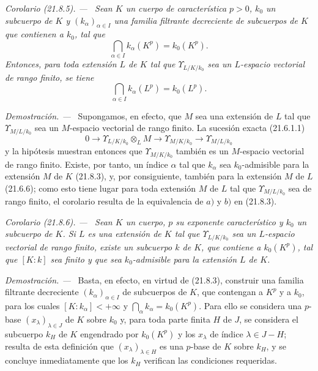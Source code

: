 \documentclass[10pt,oneside]{book}
\makeatletter
\newcommand{\setmanualcurrentlabel}[1]{\def\@currentlabel{#1}}
\newenvironment{corollary}[1][]{%
  \setmanualcurrentlabel{#1}\par\medskip\noindent\itshape Corolario (#1). ---\ }{\par}
\newenvironment{proof}{%
  \par\medskip\noindent\textit{Demostración. ---\ }}{\par}
\providecommand{\setmin}{-}%
\makeatother
\begin{document}
\begin{corollary}[21.8.5]
\label{0.21.8.5-es}
Sean $K$ un cuerpo de característica $p>0$, $k_0$ un subcuerpo de $K$ y
$(k_\alpha)_{\alpha\in I}$ una familia filtrante decreciente de subcuerpos de
$K$ que contienen a $k_0$, tal que
\[
  \bigcap_{\alpha\in I}k_\alpha(K^p)=k_0(K^p).
\]
Entonces, para toda extensión $L$ de $K$ tal que $\Upsilon_{L/K/k_0}$ sea un
$L$-espacio vectorial de rango finito, se tiene
\[
  \bigcap_{\alpha\in I}k_\alpha(L^p)=k_0(L^p).
\]
\end{corollary}

\begin{proof}
Supongamos, en efecto, que $M$ sea una extensión de $L$ tal que
$\Upsilon_{M/L/k_0}$ sea un $M$-espacio vectorial de rango finito. La sucesión
exacta (21.6.1.1)
\[
  0\longrightarrow \Upsilon_{L/K/k_0}\otimes_L M
  \longrightarrow \Upsilon_{M/K/k_0}
  \longrightarrow \Upsilon_{M/L/k_0}
\]
y la hipótesis muestran entonces que $\Upsilon_{M/K/k_0}$ también es un
$M$-espacio vectorial de rango finito. Existe, por tanto, un índice $\alpha$
tal que $k_\alpha$ sea $k_0$-admisible para la extensión $M$ de $K$ (21.8.3),
y, por consiguiente, también para la extensión $M$ de $L$ (21.6.6); como esto
tiene lugar para toda extensión $M$ de $L$ tal que $\Upsilon_{M/L/k_0}$ sea de
rango finito, el corolario resulta de la equivalencia de $a)$ y $b)$ en
(21.8.3).
\end{proof}

\begin{corollary}[21.8.6]
\label{0.21.8.6-es}
Sean $K$ un cuerpo, $p$ su exponente característico y $k_0$ un subcuerpo de
$K$. Si $L$ es una extensión de $K$ tal que $\Upsilon_{L/K/k_0}$ sea un
$L$-espacio vectorial de rango finito, existe un subcuerpo $k$ de $K$, que
contiene a $k_0(K^p)$, tal que $[K:k]$ sea finito y que sea $k_0$-admisible
para la extensión $L$ de $K$.
\end{corollary}

\begin{proof}
Basta, en efecto, en virtud de (21.8.3), construir una familia filtrante
decreciente $(k_\alpha)_{\alpha\in I}$ de subcuerpos de $K$, que contengan a
$K^p$ y a $k_0$, para los cuales $[K:k_\alpha]<+\infty$ y
$\bigcap_\alpha k_\alpha=k_0(K^p)$. Para ello se considera una $p$-base
$(x_\lambda)_{\lambda\in J}$ de $K$ sobre $k_0$ y, para toda parte finita
$H$ de $J$, se considera el subcuerpo $k_H$ de $K$ engendrado por
$k_0(K^p)$ y los $x_\lambda$ de índice $\lambda\in J\setmin H$; resulta de esta
definición que $(x_\lambda)_{\lambda\in H}$ es una $p$-base de $K$ sobre
$k_H$, y se concluye inmediatamente que los $k_H$ verifican las condiciones
requeridas.
\end{proof}
\end{document}
